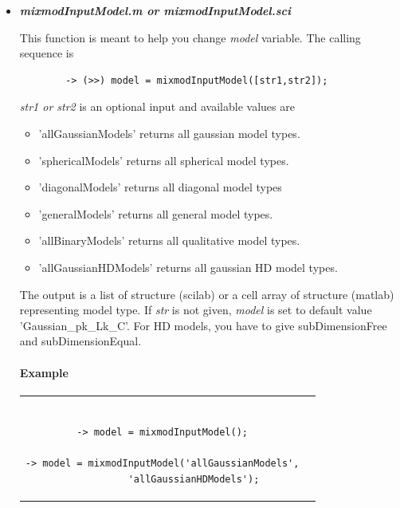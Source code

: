 \begin{itemize}
\item {\textbf {{\large {\em mixmodInputModel.m or mixmodInputModel.sci}}}}

This function is meant to help you change {\em model} variable.
The calling sequence is
\begin{verbatim}
        -> (>>) model = mixmodInputModel([str1,str2]);
\end{verbatim}

{\em str1 or str2} is an optional input and available values are
	 \begin{itemize}
	\item 'allGaussianModels' returns all gaussian model types.
		\item 'sphericalModels'   returns all spherical model types.
		\item 'diagonalModels'    returns all diagonal model types
		\item 'generalModels'     returns all general model types.
                \item 'allBinaryModels'   returns all qualitative model types.
                \item 'allGaussianHDModels' returns all gaussian HD model types.
         \end{itemize}

The output is a list of structure (scilab) or a cell array of structure (matlab) representing model type.
If {\em str} is not given, {\em model} is set to default value 'Gaussian\_pk\_Lk\_C'. For HD models,
you have to give subDimensionFree and subDimensionEqual.



\paragraph{Example\\}

\begin{tabular}{c|c}
\begin{minipage}[c]{0.45\columnwidth}%
{\scriptsize
\begin{verbatim}

-> model = mixmodInputModel();

-> model = mixmodInputModel('allGaussianModels',
           'allGaussianHDModels');
\end{verbatim}}
\end{minipage}%
&
\begin{minipage}[c]{0.45\columnwidth}%
{\scriptsize
\begin{verbatim}


\end{verbatim}}
\end{minipage}
\end{tabular}
\end{itemize}
